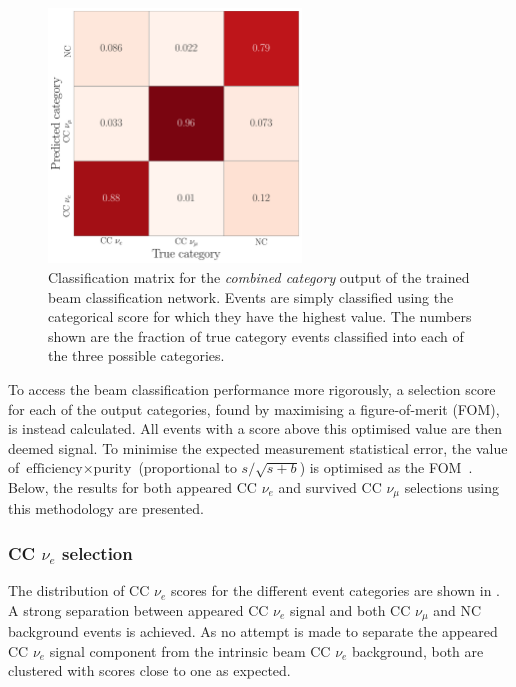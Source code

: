 \begin{figure} %
    \includegraphics[width=0.6\textwidth]{diagrams/7-results/final_comb_cat_confusion.pdf}
    \caption[Classification matrix for the combined category output of the beam classification
        network] {Classification matrix for the \emph{combined category} output of the trained
        beam classification network. Events are simply classified using the categorical score for
        which they have the highest value. The numbers shown are the fraction of true category
        events classified into each of the three possible categories.}
    \label{fig:final_comb_cat_confusion}
\end{figure}

To access the beam classification performance more rigorously, a selection score for each of the
output categories, found by maximising a figure-of-merit (FOM), is instead calculated. All events
with a score above this optimised value are then deemed signal. To minimise the expected
measurement statistical error, the value of $\text{efficiency}\times\text{purity}$ (proportional
to $s/\sqrt{s+b}$) is optimised as the FOM~\cite{list2002}. Below, the results for both appeared
CC $\nu_{e}$ and survived CC $\nu_{\mu}$ selections using this methodology are presented.

\subsubsection*{CC $\nu_{e}$ selection} %

The distribution of CC $\nu_{e}$ scores for the different event categories are shown in
. A strong separation between appeared CC $\nu_{e}$ signal
and both CC $\nu_{\mu}$ and NC background events is achieved. As no attempt is made to separate
the appeared CC $\nu_{e}$ signal component from the intrinsic beam CC $\nu_{e}$ background, both
are clustered with scores close to one as expected.

